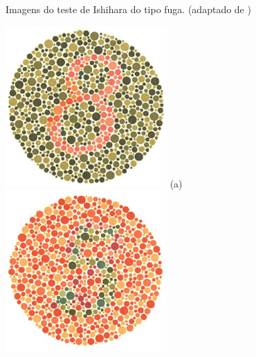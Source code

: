 \documentclass[	12pt, Times, openright, twoside, a4paper, english, brazil]{abntex2}
\begin{document}
\begin{apendicesenv}
\begin{figure}[!htb]
\caption{Imagens do teste de Ishihara do tipo fuga. (adaptado de )}
\label{fig:apendiceFuga}

\end{figure}



\begin{figure}[!htb]
\centering
{\includegraphics[width=\linewidth]{ishihara-transformacao/plate2.png}}
(a)
\endminipage\hfill
{}
\centering
{\includegraphics[width=\linewidth]{ishihara-transformacao/plate6.png}}

\end{figure}
\end{apendicesenv}
\end{document}
